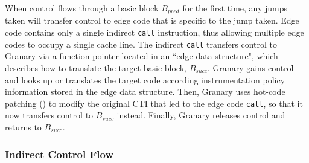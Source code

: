 \documentclass[preprint]{sigplanconf}
\begin{document}
When control flows through a basic block $B_{pred}$ for the first time, any jumps taken will transfer control to edge code that is specific to the jump taken. Edge code contains only a single indirect \texttt{call} instruction, thus allowing multiple edge codes to occupy a single cache line. The indirect \texttt{call} transfers control to Granary via a function pointer located in an ``edge data structure", which describes how to translate the target basic block, $B_{succ}$. Granary gains control and looks up or translates the target code according instrumentation policy information stored in the edge data structure. Then, Granary uses hot-code patching () to modify the original CTI that led to the edge code \texttt{call}, so that it now transfers control to $B_{succ}$ instead. Finally, Granary releases control and returns to $B_{succ}$.


\subsubsection{Indirect Control Flow}\label{sec:ibl}




\end{document}
